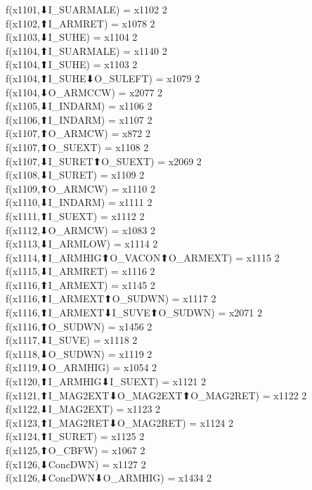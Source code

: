 f(x1101,⬇I_SUARMALE) = x1102 {2} \\
f(x1102,⬆I_ARMRET) = x1078 {2} \\
f(x1103,⬇I_SUHE) = x1104 {2} \\
f(x1104,⬆I_SUARMALE) = x1140 {2} \\
f(x1104,⬆I_SUHE) = x1103 {2} \\
f(x1104,⬆I_SUHE⬇O_SULEFT) = x1079 {2} \\
f(x1104,⬇O_ARMCCW) = x2077 {2} \\
f(x1105,⬇I_INDARM) = x1106 {2} \\
f(x1106,⬆I_INDARM) = x1107 {2} \\
f(x1107,⬆O_ARMCW) = x872 {2} \\
f(x1107,⬆O_SUEXT) = x1108 {2} \\
f(x1107,⬇I_SURET⬆O_SUEXT) = x2069 {2} \\
f(x1108,⬇I_SURET) = x1109 {2} \\
f(x1109,⬆O_ARMCW) = x1110 {2} \\
f(x1110,⬇I_INDARM) = x1111 {2} \\
f(x1111,⬆I_SUEXT) = x1112 {2} \\
f(x1112,⬇O_ARMCW) = x1083 {2} \\
f(x1113,⬇I_ARMLOW) = x1114 {2} \\
f(x1114,⬆I_ARMHIG⬆O_VACON⬆O_ARMEXT) = x1115 {2} \\
f(x1115,⬇I_ARMRET) = x1116 {2} \\
f(x1116,⬆I_ARMEXT) = x1145 {2} \\
f(x1116,⬆I_ARMEXT⬆O_SUDWN) = x1117 {2} \\
f(x1116,⬆I_ARMEXT⬇I_SUVE⬆O_SUDWN) = x2071 {2} \\
f(x1116,⬆O_SUDWN) = x1456 {2} \\
f(x1117,⬇I_SUVE) = x1118 {2} \\
f(x1118,⬇O_SUDWN) = x1119 {2} \\
f(x1119,⬇O_ARMHIG) = x1054 {2} \\
f(x1120,⬆I_ARMHIG⬇I_SUEXT) = x1121 {2} \\
f(x1121,⬆I_MAG2EXT⬇O_MAG2EXT⬆O_MAG2RET) = x1122 {2} \\
f(x1122,⬇I_MAG2EXT) = x1123 {2} \\
f(x1123,⬆I_MAG2RET⬇O_MAG2RET) = x1124 {2} \\
f(x1124,⬆I_SURET) = x1125 {2} \\
f(x1125,⬆O_CBFW) = x1067 {2} \\
f(x1126,⬇ConcDWN) = x1127 {2} \\
f(x1126,⬇ConcDWN⬇O_ARMHIG) = x1434 {2} \\
